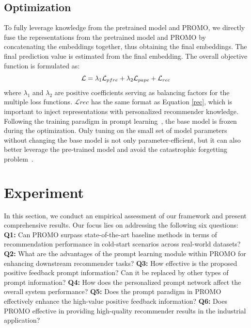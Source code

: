\documentclass[sigconf]{acmart}
\newcommand{\sys}{\textsc{PROMO}\xspace}
\begin{document}
\subsection{Optimization}
To fully leverage knowledge from the pretrained model and \sys, we directly fuse the representations from the pretrained model and \sys by concatenating the embeddings together, thus obtaining the final embeddings. 
The final prediction value is estimated from the final embedding. 
The overall objective function is formulated as:
\begin{equation}\small
\mathcal{L} = \lambda_1\mathcal{L}_{pfre} + \lambda_2\mathcal{L}_{pape} + \mathcal{L}_{rec}
\end{equation}
where $\lambda_1$ and $\lambda_2$ are positive coefficients serving as balancing factors for the multiple loss functions.
$\mathcal{L}{rec}$ has the same format as Equation \ref{rec}, which is important to inject representations with personalized recommender knowledge. 
Following the training paradigm in prompt learning~\cite{lester2021power}, the base model is frozen during the optimization. 
Only tuning on the small set of model parameters without changing the base model is not only parameter-efficient, but it can also better leverage the pre-trained model and avoid the catastrophic forgetting problem~\cite{kirkpatrick2017overcoming}.

\section{Experiment}
In this section, we conduct an empirical assessment of our framework and present comprehensive results. Our focus lies on addressing the following six questions:
\textbf{Q1:} Can \sys surpass state-of-the-art baseline methods in terms of recommendation performance in cold-start scenarios across real-world datasets?
\textbf{Q2:} What are the advantages of the prompt learning module within \sys for enhancing downstream recommender tasks?
\textbf{Q3:} How effective is the proposed positive feedback prompt information? Can it be replaced by other types of prompt information?
\textbf{Q4:} How does the personalized prompt network affect the overall system performance?
\textbf{Q5:} Does the prompt paradigm in \sys effectively enhance the high-value positive feedback information?
\textbf{Q6:} Does \sys effective in providing high-quality recommender results in the industrial application? 
\end{document}
